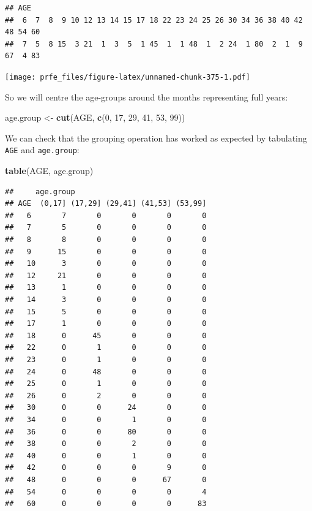 \documentclass[12pt,a4paper]{book}
\newenvironment{Shaded}{\begin{snugshade}}{\end{snugshade}}
\newcommand{\DecValTok}[1]{\textcolor[rgb]{0.00,0.00,0.81}{#1}}
\newcommand{\KeywordTok}[1]{\textcolor[rgb]{0.13,0.29,0.53}{\textbf{#1}}}
\newcommand{\NormalTok}[1]{#1}
\newcommand{\StringTok}[1]{\textcolor[rgb]{0.31,0.60,0.02}{#1}}
\theoremstyle{definition}
\theoremstyle{definition}
\theoremstyle{definition}
\theoremstyle{remark}
\begin{document}
\begin{verbatim}
## AGE
##  6  7  8  9 10 12 13 14 15 17 18 22 23 24 25 26 30 34 36 38 40 42 48 54 60 
##  7  5  8 15  3 21  1  3  5  1 45  1  1 48  1  2 24  1 80  2  1  9 67  4 83
\end{verbatim}

\texttt{[image: prfe\_files/figure-latex/unnamed-chunk-375-1.pdf]}

So we will centre the age-groups around the months representing full
years:

\begin{Shaded}
\begin{Highlighting}[]
\NormalTok{age.group <-}\StringTok{ }\KeywordTok{cut}\NormalTok{(AGE, }\KeywordTok{c}\NormalTok{(}\DecValTok{0}\NormalTok{, }\DecValTok{17}\NormalTok{, }\DecValTok{29}\NormalTok{, }\DecValTok{41}\NormalTok{, }\DecValTok{53}\NormalTok{, }\DecValTok{99}\NormalTok{))}
\end{Highlighting}
\end{Shaded}

We can check that the grouping operation has worked as expected by
tabulating \texttt{AGE} and \texttt{age.group}:

\begin{Shaded}
\begin{Highlighting}[]
\KeywordTok{table}\NormalTok{(AGE, age.group)}
\end{Highlighting}
\end{Shaded}

\begin{verbatim}
##     age.group
## AGE  (0,17] (17,29] (29,41] (41,53] (53,99]
##   6       7       0       0       0       0
##   7       5       0       0       0       0
##   8       8       0       0       0       0
##   9      15       0       0       0       0
##   10      3       0       0       0       0
##   12     21       0       0       0       0
##   13      1       0       0       0       0
##   14      3       0       0       0       0
##   15      5       0       0       0       0
##   17      1       0       0       0       0
##   18      0      45       0       0       0
##   22      0       1       0       0       0
##   23      0       1       0       0       0
##   24      0      48       0       0       0
##   25      0       1       0       0       0
##   26      0       2       0       0       0
##   30      0       0      24       0       0
##   34      0       0       1       0       0
##   36      0       0      80       0       0
##   38      0       0       2       0       0
##   40      0       0       1       0       0
##   42      0       0       0       9       0
##   48      0       0       0      67       0
##   54      0       0       0       0       4
##   60      0       0       0       0      83
\end{verbatim}
\end{document}
